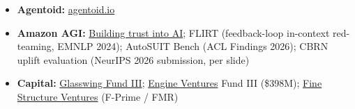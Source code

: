 \documentclass[11pt]{article}
\begin{document}
\begin{itemize}[leftmargin=*]
    \item \textbf{Agentoid:} \href{https://www.agentoid.io/}{agentoid.io}
    \item \textbf{Amazon AGI:} \href{https://www.amazon.science/blog/building-trust-into-ai}{Building trust into AI}; FLIRT (feedback-loop in-context red-teaming, EMNLP 2024); AutoSUIT Bench (ACL Findings 2026); CBRN uplift evaluation (NeurIPS 2026 submission, per slide)
    \item \textbf{Capital:} \href{https://glasswing.vc/blog/funding/announcing-glasswing-ventures-200m-fund-iii/}{Glasswing Fund III}; \href{https://www.engineventures.com/}{Engine Ventures} Fund III (\$398M); \href{https://finestructure.vc/}{Fine Structure Ventures} (F-Prime / FMR)
\end{itemize}
\endgroup
\end{document}

